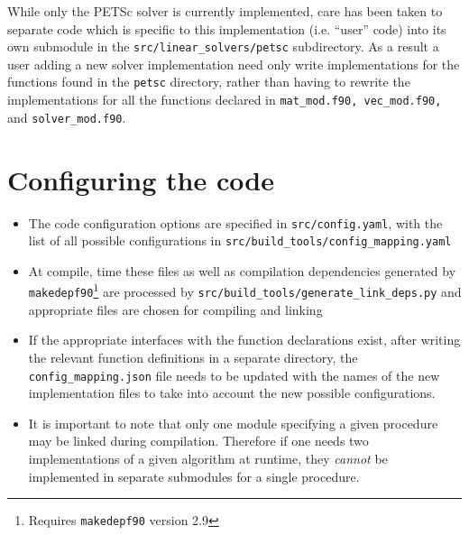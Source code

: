 \documentclass[11pt]{report}
\begin{document}
While only the PETSc solver is currently implemented, care has been taken to separate code which is specific to this implementation (i.e. ``user'' code) into its own submodule in the \texttt{src/linear\_solvers/petsc} subdirectory. As a result a user adding a new solver implementation need only write implementations for the functions found in the \texttt{petsc} directory, rather than having to rewrite the implementations for all the functions declared in \texttt{mat\_mod.f90, vec\_mod.f90,} and \texttt{solver\_mod.f90}. 


\section{Configuring the code}
\begin{itemize}
  \item The code configuration options are specified in \texttt{src/config.yaml}, with the list of all possible configurations in \texttt{src/build\_tools/config\_mapping.yaml}
  \item At compile, time these files as well as compilation dependencies generated by \texttt{makedepf90}\footnote{Requires \texttt{makedepf90} version 2.9} are processed by \texttt{src/build\_tools/generate\_link\_deps.py} and appropriate files are chosen for compiling and linking
  \item If the appropriate interfaces with the function declarations exist, after writing the relevant function definitions in a separate directory, the \texttt{config\_mapping.json} file needs to be updated with the names of the new implementation files to take into account the new possible configurations.
  \item It is important to note that only one module specifying a given procedure may be linked during compilation. Therefore if one needs two implementations of a given algorithm at runtime, they \emph{cannot} be implemented in separate submodules for a single procedure. 
\end{itemize}
\end{document}
